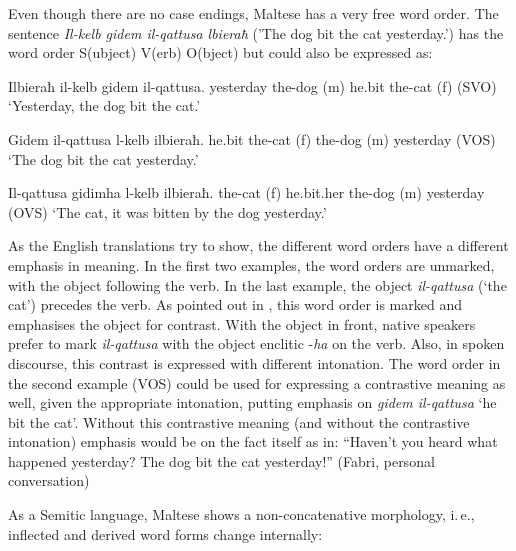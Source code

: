 \begin{multicols}{2}

Even though there are no case endings, Maltese has a very free word order. The sentence \emph{Il-kelb gidem il-qattusa lbieraħ} ('The dog bit the cat yesterday.') has the word order S(ubject) V(erb) O(bject) but could also be expressed as:

\begin{examples}\label{WO_no_clitics_en}
\item
\gll Ilbieraħ il-kelb gidem il-qattusa.
yesterday	{the-dog (m)} he.bit	{the-cat (f)}
\gln (SVO)
\glt `Yesterday, the dog bit the cat.'
\glend

\item
\gll Gidem il-qattusa l-kelb ilbieraħ.
he.bit {the-cat (f)} {the-dog (m)} yesterday
\gln (VOS)
\glt `The dog bit the cat yesterday.'
\glend

\item
\gll Il-qattusa gidimha l-kelb ilbieraħ.
{the-cat (f)} he.bit.her {the-dog (m)} yesterday
\gln (OVS)
\glt `The cat, it was bitten by the dog yesterday.'
\glend
\end{examples}

As the English translations try to show, the different word orders have a different emphasis in meaning. In the first two examples, the word orders are unmarked, with the object following the verb. In the last example, the object \emph{il-qattusa} (`the cat') precedes the verb. As pointed out in \cite[p.~140]{Fabri:1993}, this word order is marked and emphasises the object for contrast. With the object in front, native speakers prefer to mark \emph{il-qattusa} with the object enclitic -\emph{ha} on the verb. Also, in spoken discourse, this contrast is expressed with different intonation. The word order in the second example (VOS) could be used for expressing a contrastive meaning as well, given the appropriate intonation, putting emphasis on \emph{gidem il-qattusa} `he bit the cat'. Without this contrastive meaning (and without the contrastive intonation) emphasis would be on the fact itself as in: ``Haven’t you heard what happened yesterday? The dog bit the cat yesterday!'' (Fabri, personal conversation)


As a Semitic language, Maltese shows a non-concatenative morphology, i.\,e., inflected and derived word forms change internally:


\end{multicols}

